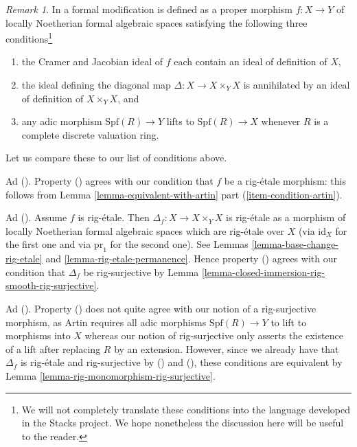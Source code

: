 \documentclass{stacks-project}
\theoremstyle{plain}
\theoremstyle{definition}
\theoremstyle{remark}
\newtheorem{remark}[subsection]{Remark}
\numberwithin{equation}{subsection}
\begin{document}
\begin{remark}
\label{remark-compare-formal-modification-artin}
In \cite[Definition 1.7]{ArtinII} a formal modification is defined as a
proper morphism $f : X \to Y$ of locally Noetherian formal algebraic spaces
satisfying the following three conditions\footnote{We will not completely
translate these conditions into the language developed in the Stacks
project. We hope nonetheless the discussion here will be useful to the
reader.}
\begin{enumerate}
\item[(\romannumeral1)] the Cramer and Jacobian ideal of
$f$ each contain an ideal of definition of $X$,
\item[(\romannumeral2)] the ideal defining the
diagonal map $\Delta : X \to X \times_Y X$
is annihilated by an ideal of definition of $X \times_Y X$, and
\item[(\romannumeral3)] any adic morphism $\text{Spf}(R) \to Y$
lifts to $\text{Spf}(R) \to X$ whenever $R$ is a
complete discrete valuation ring.
\end{enumerate}
Let us compare these to our list of conditions above.

\medskip\noindent
Ad (). Property () agrees with our condition
that $f$ be a rig-\'etale morphism: this follows from
Lemma \ref{lemma-equivalent-with-artin} part (\ref{item-condition-artin}).

\medskip\noindent
Ad (). Assume $f$ is rig-\'etale. Then
$\Delta_f : X \to X \times_Y X$ is rig-\'etale as a morphism
of locally Noetherian formal algebraic spaces which are
rig-\'etale over $X$ (via $\text{id}_X$ for the first one and via
$\text{pr}_1$ for the second one).
See Lemmas \ref{lemma-base-change-rig-etale} and
\ref{lemma-rig-etale-permanence}.
Hence property () agrees with our condition
that $\Delta_f$ be rig-surjective by
Lemma \ref{lemma-closed-immersion-rig-smooth-rig-surjective}.

\medskip\noindent
Ad (). Property () does not quite
agree with our notion of a rig-surjective morphism, as Artin
requires all adic morphisms $\text{Spf}(R) \to Y$ to lift to
morphisms into $X$ whereas our notion of rig-surjective only
asserts the existence of a lift after replacing $R$ by an extension.
However, since we already have that $\Delta_f$ is
rig-\'etale and rig-surjective by () and (),
these conditions are equivalent by
Lemma \ref{lemma-rig-monomorphism-rig-surjective}.
\end{remark}
\end{document}
